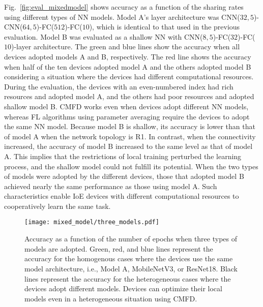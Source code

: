 \documentclass[journal]{IEEEtran}
\begin{document}
Fig.~\ref{fig:eval_mixedmodel} shows accuracy as a function of the sharing rates using different types of \gls{NN} models.
Model A's layer architecture was CNN($32, 5$)-CNN($64, 5$)-FC($512$)-FC($10$), which is identical to that used in the previous evaluation.
Model B was evaluated as a shallow \gls{NN} with CNN($8, 5$)-FC($32$)-FC($10$)-layer architecture.
The green and blue lines show the accuracy when all devices adopted models A and B, respectively.
The red line shows the accuracy when half of the ten devices adopted model A and the others adopted model B
considering a situation where the devices had different computational resources.
During the evaluation, the devices with an even-numbered index had rich resources and adopted model A,
and the others had poor resources and adopted shallow model B.
\Gls{CMFD} works even when devices adopt different \gls{NN} models,
whereas \gls{FL} algorithms using parameter averaging require the devices to adopt the same \gls{NN} model.
Because model B is shallow, its accuracy is lower than that of model A when the network topology is R1.
In contrast, when the connectivity increased, the accuracy of model B increased to the same level as that of model A.
This implies that the restrictions of local training perturbed the learning process, and the shallow model could not fulfill its potential.
When the two types of models were adopted by the different devices,
those that adopted model B achieved nearly the same performance as those using model A.
Such characteristics enable \gls{IoE} devices with different computational resources to cooperatively learn the same task.

\begin{figure}[!t]
\centering
\texttt{[image: mixed\_model/three\_models.pdf]}
\caption{
Accuracy as a function of the number of epochs when three types of models are adopted.
Green, red, and blue lines represent the accuracy for the homogenous cases where the devices use the same model architecture, i.e., Model A, MobileNetV3, or ResNet18.
Black lines represent the accuracy for the heterogeneous cases where the devices adopt different models.
Devices can optimize their local models even in a heterogeneous situation using \gls{CMFD}.
}
\label{fig:eval_mixedmodel_conv}
\end{figure}
\end{document}
